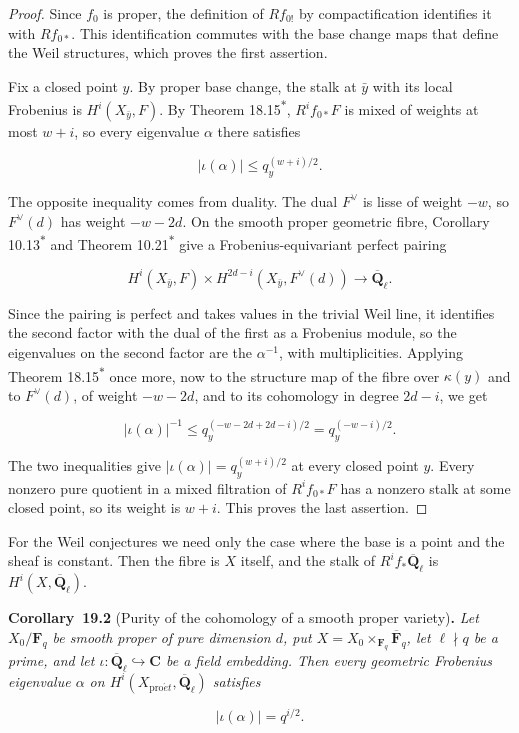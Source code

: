 \documentclass[11pt]{article}
\newenvironment{bpstatement}[2]{\par\addvspace{0.6\baselineskip}\noindent\textbf{#1}#2\textbf{.}\enspace\ignorespaces}
  {\par\addvspace{0.4\baselineskip}}
\newenvironment{bpstatementit}[2]{\begin{bpstatement}{#1}{#2}\itshape\ignorespaces}{\end{bpstatement}}
\newcommand{\bpout}[1]{#1\textsuperscript{\hyperlink{bp-outside}{\ensuremath{\ast}}}}
\begin{document}
\begin{proof}[{Proof}]\label{bp6}%
Since \(f_0\) is proper, the definition of \(Rf_{0!}\) by compactification identifies it with \(Rf_{0*}\). This identification commutes with the base change maps that define the Weil structures, which proves the first assertion.

Fix a closed point \(y\). By proper base change, the stalk at \(\bar y\) with its local Frobenius is \(H^i(X_{\bar y},F)\). By Theorem \bpout{18.15}, \(R^if_{0*}F\) is mixed of weights at most \(w+i\), so every eigenvalue \(\alpha\) there satisfies

\[
|\iota(\alpha)|\leq q_y^{(w+i)/2}.
\]

The opposite inequality comes from duality. The dual \(F^\vee\) is lisse of weight \(-w\), so \(F^\vee(d)\) has weight \(-w-2d\). On the smooth proper geometric fibre, Corollary \bpout{10.13} and Theorem \bpout{10.21} give a Frobenius-equivariant perfect pairing

\[
H^i(X_{\bar y},F)\times
H^{2d-i}(X_{\bar y},F^\vee(d))\longrightarrow\overline{\mathbf Q}_\ell.
\]

Since the pairing is perfect and takes values in the trivial Weil line, it identifies the second factor with the dual of the first as a Frobenius module, so the eigenvalues on the second factor are the \(\alpha^{-1}\), with multiplicities. Applying Theorem \bpout{18.15} once more, now to the structure map of the fibre over \(\kappa(y)\) and to \(F^\vee(d)\), of weight \(-w-2d\), and to its cohomology in degree \(2d-i\), we get

\[
|\iota(\alpha)|^{-1}
\leq q_y^{(-w-2d+2d-i)/2}=q_y^{(-w-i)/2}.
\]

The two inequalities give \(|\iota(\alpha)|=q_y^{(w+i)/2}\) at every closed point \(y\). Every nonzero pure quotient in a mixed filtration of \(R^if_{0*}F\) has a nonzero stalk at some closed point, so its weight is \(w+i\). This proves the last assertion.
\end{proof}

\label{bp7}%
For the Weil conjectures we need only the case where the base is a point and the sheaf is constant. Then the fibre is \(X\) itself, and the stalk of \(R^if_*\overline{\mathbf Q}_\ell\) is \(H^i(X,\overline{\mathbf Q}_\ell)\).

\label{bp8}%
\begin{bpstatementit}{Corollary~19.2}{ (Purity of the cohomology of a smooth proper variety)}
Let \(X_0/\mathbf F_q\) be smooth proper of pure dimension \(d\), put \(X=X_0\times_{\mathbf F_q}\overline{\mathbf F}_q\), let \(\ell\nmid q\) be a prime, and let \(\iota:\overline{\mathbf Q}_\ell\hookrightarrow\mathbf C\) be a field embedding. Then every geometric Frobenius eigenvalue \(\alpha\) on \(H^i(X_{\mathrm{pro}\acute{e}t},\overline{\mathbf Q}_\ell)\) satisfies

\[
|\iota(\alpha)|=q^{i/2}.
\]
\end{bpstatementit}
\end{document}
